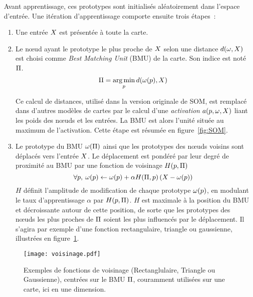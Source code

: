 \documentclass[../main]{subfiles}
\begin{document}
Avant apprentissage, ces prototypes sont initialisés aléatoirement dans l'espace d'entrée.
Une itération d'apprentissage comporte ensuite trois étapes~:
\begin{enumerate}
\item Une entrée $X$ est présentée à toute la carte.
\item Le n\oe{}ud ayant le prototype le plus proche de $X$ selon une distance $d(\omega, X)$ est choisi comme \emph{Best Matching Unit} (BMU) de la carte. Son indice est noté $\Pi$. \begin{equation}
    \Pi = \operatorname*{arg\,min}\limits_p d(\omega(p),X)
\end{equation}

Ce calcul de distances, utilisé dans la version originale de SOM, est remplacé dans d'autres modèles de cartes par le calcul d'une \emph{activation} $a(p, \omega, X)$ liant les poids des n\oe{}uds et les entrées.
La BMU est alors l'unité située au maximum de l'activation. Cette étape est résumée en figure~\ref{fig:SOM}.
\item Le prototype du BMU $\omega(\Pi)$ ainsi que les prototypes des n\oe{}uds voisins sont déplacés vers l'entrée $X$. Le déplacement est pondéré par leur degré de proximité au BMU par une fonction de voisinage $H(p,\Pi)$
\begin{equation} \forall p, \:\omega(p) \leftarrow \omega(p) + \alpha H(\Pi,p) \left( X - \omega(p)\right) \end{equation}
$H$ définit l'amplitude de modification de chaque prototype $\omega(p)$, en modulant le taux d'apprentissage $\alpha$ par $H(p,\Pi)$. $H$ est maximale à la position du BMU et décroissante autour de cette position, de sorte que les prototypes des n\oe{}uds les plus proches de $\Pi$ soient les plus influencés par le déplacement. Il s'agira par exemple d'une fonction rectangulaire, triangle ou gaussienne, illustrées en figure~\ref{fig:h}.
\end{enumerate}

\begin{figure}
     \centering
     \texttt{[image: voisinage.pdf]}
     \caption{Exemples de fonctions de voisinage (Rectanglulaire, Triangle ou Gaussienne), centrées sur le BMU $\Pi$, couramment utilisées sur une carte, ici en une dimension.\label{fig:h}}
\end{figure}
\end{document}
